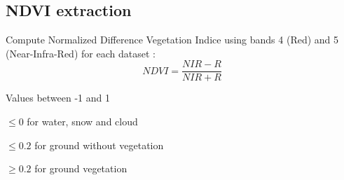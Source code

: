 \documentclass[c]{beamer}
\begin{document}
\subsection{NDVI extraction}
\begin{frame}
\tableofcontents[currentsubsection]
\end{frame}

\begin{frame}
\begin{itemize}
{
 \item Compute Normalized Difference Vegetation Indice using bands 4 (Red) and 5 (Near-Infra-Red) for each dataset :
 {\scriptsize \[NDVI=\frac{NIR-R}{NIR+R}\]}
 \item Values between -1 and 1
 \item $\leq 0$ for water, snow and cloud
 \item $\leq 0.2$ for  ground without vegetation
 \item $\geq 0.2$ for ground vegetation
}
\end{itemize}


\end{frame}
\end{document}
